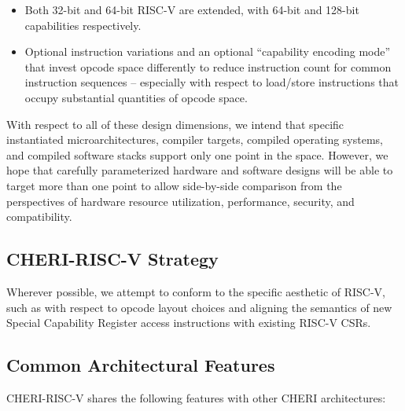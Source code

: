 \begin{itemize}
\item Both 32-bit and 64-bit RISC-V are extended, with 64-bit and 128-bit
  capabilities respectively.

\item Optional instruction variations and an optional ``capability encoding
  mode'' that
  invest opcode space differently to reduce instruction count for common
  instruction sequences -- especially with respect to load/store instructions
  that occupy substantial quantities of opcode space.
\end{itemize}

With respect to all of these design dimensions, we intend that specific
instantiated microarchitectures, compiler targets, compiled operating systems,
and compiled software stacks support only one point in the space.
However, we hope that carefully parameterized hardware and software designs
will be able to target more than one point to allow side-by-side comparison
from the perspectives of hardware resource utilization, performance, security,
and compatibility.

\subsection{CHERI-RISC-V Strategy}

Wherever possible, we attempt to conform to the specific aesthetic of RISC-V,
such as with respect to opcode layout choices and aligning the semantics of
new Special Capability Register access instructions with existing RISC-V CSRs.


\subsection{Common Architectural Features}

CHERI-RISC-V shares the following features with other CHERI architectures:

